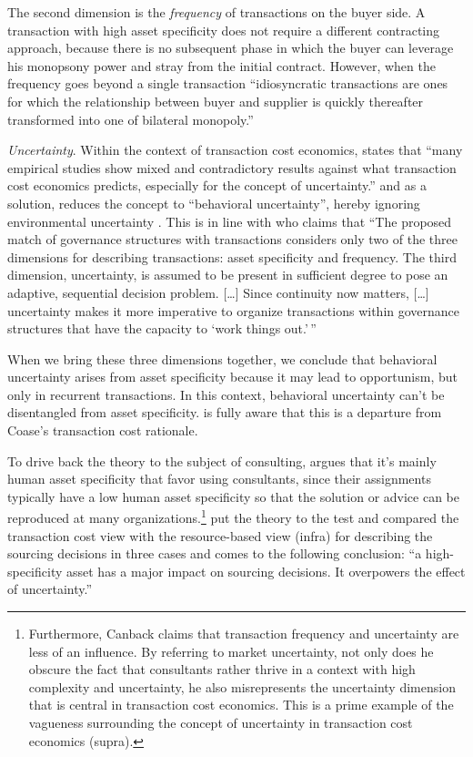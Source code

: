 \documentclass[12pt]{article}
\begin{document}
The second dimension is the \emph{frequency} of transactions on the
buyer side. A transaction with high asset specificity does not require a
different contracting approach, because there is no subsequent phase in
which the buyer can leverage his monopsony power and stray from the
initial contract. However, when the frequency goes beyond a single
transaction ``idiosyncratic transactions are ones for which the
relationship between buyer and supplier is quickly thereafter
transformed into one of bilateral monopoly.'' \citep[
241]{williamson1985}

\emph{Uncertainty}. Within the context of transaction cost economics,
\citet[38]{shin2003} states that ``many empirical studies show mixed and
contradictory results against what transaction cost economics predicts,
especially for the concept of uncertainty.'' and as a solution, reduces
the concept to ``behavioral uncertainty'', hereby ignoring environmental
uncertainty \citep[ 391-392]{watjatrakul2005}. This is in line with
\citet[79]{williamson1985} who claims that ``The proposed match of
governance structures with transactions considers only two of the three
dimensions for describing transactions: asset specificity and frequency.
The third dimension, uncertainty, is assumed to be present in sufficient
degree to pose an adaptive, sequential decision problem. {[}\ldots{]}
Since continuity now matters, {[}\ldots{]} uncertainty makes it more
imperative to organize transactions within governance structures that
have the capacity to `work things out.'\,''

When we bring these three dimensions together, we conclude that
behavioral uncertainty arises from asset specificity because it may lead
to opportunism, but only in recurrent transactions. In this context,
behavioral uncertainty can't be disentangled from asset specificity.
\citet[78]{williamson1985} is fully aware that this is a departure from
Coase's transaction cost rationale.

To drive back the theory to the subject of consulting,
\citet[37]{canback1998} argues that it's mainly human asset specificity
that favor using consultants, since their assignments typically have a
low human asset specificity so that the solution or advice can be
reproduced at many organizations.\footnote{Furthermore, Canback claims
  that transaction frequency and uncertainty are less of an influence.
  By referring to market uncertainty, not only does he obscure the fact
  that consultants rather thrive in a context with high complexity and
  uncertainty, he also misrepresents the uncertainty dimension that is
  central in transaction cost economics. This is a prime example of the
  vagueness surrounding the concept of uncertainty in transaction cost
  economics (supra).} \citet[408]{watjatrakul2005} put the theory to the
test and compared the transaction cost view with the resource-based view
(infra) for describing the sourcing decisions in three cases and comes
to the following conclusion: ``a high-specificity asset has a major
impact on sourcing decisions. It overpowers the effect of uncertainty.''
\end{document}
